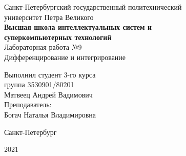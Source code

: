 \documentclass[a4paper]{article}
\begin{document}
    \begin{center}
        \begin{center}
        \hfill \break
        \normalsize{Санкт-Петербургский государственный политехнический}\\
        \normalsize{университет Петра Великого}\\
        \hfill \break
        \normalsize{\textbf{Высшая школа интеллектуальных систем и}}\\ 
        \normalsize{\textbf{суперкомпьютерных технологий}}\\ 
        \hfill \break
        \hfill \break
        \hfill \break
        \normalsize{Лабораторная работа №9}\\
        \hfill \break
        \hfill \break
        \normalsize{\LARGE Дифференцирование и интегрирование}\\
        \end{center}
        \hfill \break
        \hfill \break
        \hfill \break
        \hfill \break
        \hfill \break
        \hfill \break
        \hfill \break
        \hfill \break
        \hfill \break
        \hfill \break
        \begin{flushright}
            \normalsize{Выполнил студент 3-го курса}\\
            \normalsize{группа 3530901/80201}\\
            \normalsize{Матвеец Андрей Вадимович}\\
            \hfill \break
            \normalsize{Преподаватель:}\\
            \normalsize{Богач Наталья Владимировна}\\
        \end{flushright}
        \hfill \break
        \hfill \break
        \hfill \break
        \hfill \break
        \begin{center} Санкт-Петербург\end{center}
        \begin{center}2021\end{center} 
        \thispagestyle{empty}
    \end{center}
    
    \newpage
        \tableofcontents
    
    \newpage
         \listoffigures
    
    \newpage
         \lstlistoflistings   
     
\end{document}
